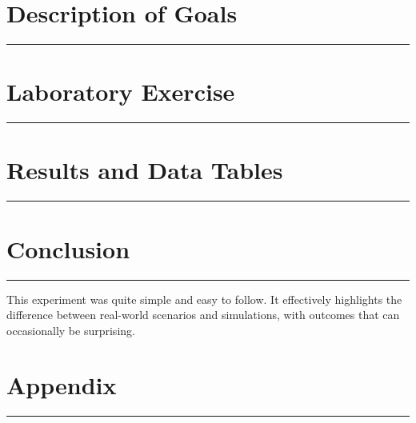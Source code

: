 \documentclass{article}
\begin{document}
\def\Class{ECE 341}
\def\ClassName{Principles of Electromechanical Energy Conversion}
\def\LabNumber{3}
\def\LabName{Introduction to Electric Machinery Lab}



\section*{Description of Goals}
\vspace{-0.1in}
\hrule
\vspace{5pt}

\section*{Laboratory Exercise}
\vspace{-0.1in}
\hrule
\vspace{5pt}

\section*{Results and Data Tables}
\vspace{-0.1in}
\hrule
\vspace{5pt}



\section*{Conclusion}
\vspace{-0.1in}
\hrule
\vspace{5pt}

This experiment was quite simple and easy to follow. It effectively highlights the difference between real-world scenarios and simulations, with outcomes that can occasionally be surprising.

\pagebreak
\section*{Appendix}
\vspace{-0.1in}
\hrule
\vspace{5pt}

% 

\end{document}
